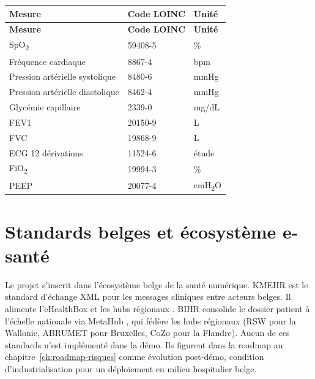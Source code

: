 \bridgezebra
\begin{longtable}{p{6cm}p{3cm}p{3cm}}
  \toprule
  \rowcolor{bridgeblue!90}
  {\color{white}\bfseries Mesure} & {\color{white}\bfseries Code LOINC} & {\color{white}\bfseries Unité} \\
  \midrule
  \endfirsthead
  \toprule
  \rowcolor{bridgeblue!90}
  {\color{white}\bfseries Mesure} & {\color{white}\bfseries Code LOINC} & {\color{white}\bfseries Unité} \\
  \midrule
  \endhead
  \bottomrule
  \endfoot
  SpO\textsubscript{2}                & 59408-5  & \%       \\
  Fréquence cardiaque                 & 8867-4   & bpm      \\
  Pression artérielle systolique      & 8480-6   & mmHg     \\
  Pression artérielle diastolique     & 8462-4   & mmHg     \\
  Glycémie capillaire                 & 2339-0   & mg/dL    \\
  FEV1                                & 20150-9  & L        \\
  FVC                                 & 19868-9  & L        \\
  ECG 12 dérivations                  & 11524-6  & étude    \\
  FiO\textsubscript{2}                & 19994-3  & \%       \\
  PEEP                                & 20077-4  & cmH\textsubscript{2}O \\
\end{longtable}

\section{Standards belges et écosystème e-santé}
\label{sec:standards-belges}

Le projet s'inscrit dans l'écosystème belge de la santé numérique. KMEHR \cite{kmehr_spec} est le standard d'échange XML pour les messages cliniques entre acteurs belges. Il alimente l'eHealthBox et les hubs régionaux \cite{ehealth_services_base}. BIHR \cite{bihr_overview} consolide le dossier patient à l'échelle nationale via MetaHub \cite{metahub_overview}, qui fédère les hubs régionaux (RSW pour la Wallonie, ABRUMET pour Bruxelles, CoZo pour la Flandre). Aucun de ces standards n'est implémenté dans la démo. Ils figurent dans la roadmap au chapitre~\ref{ch:roadmap-risques} comme évolution post-démo, condition d'industrialisation pour un déploiement en milieu hospitalier belge.

